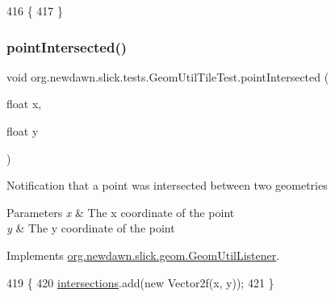 \begin{DoxyCode}
416                                                 \{
417     \}
\end{DoxyCode}
\mbox{\label{classorg_1_1newdawn_1_1slick_1_1tests_1_1_geom_util_tile_test_a05285204f69079e9aa77a552400f0c0a}} 
\subsubsection{\texorpdfstring{point\+Intersected()}{pointIntersected()}}
{\footnotesize\ttfamily void org.\+newdawn.\+slick.\+tests.\+Geom\+Util\+Tile\+Test.\+point\+Intersected (\begin{DoxyParamCaption}\item[{float}]{x,  }\item[{float}]{y }\end{DoxyParamCaption})\hspace{0.3cm}{\ttfamily [inline]}}

Notification that a point was intersected between two geometries


\begin{DoxyParams}{Parameters}
{\em x} & The x coordinate of the point \\
\hline
{\em y} & The y coordinate of the point \\
\hline
\end{DoxyParams}


Implements \mbox{\hyperlink{interfaceorg_1_1newdawn_1_1slick_1_1geom_1_1_geom_util_listener_aac2e6eb21b135b8af600cbd2fa0b1402}{org.\+newdawn.\+slick.\+geom.\+Geom\+Util\+Listener}}.


\begin{DoxyCode}
419                                                    \{
420         \mbox{\hyperlink{classorg_1_1newdawn_1_1slick_1_1tests_1_1_geom_util_tile_test_a956de47fcbfd8a345b2b42602bb65e7c}{intersections}}.add(\textcolor{keyword}{new} Vector2f(x, y));
421     \}
\end{DoxyCode}
\mbox{\label{classorg_1_1newdawn_1_1slick_1_1tests_1_1_geom_util_tile_test_a2aa4aae6b4ebaa2062067311ad02d129}} 
